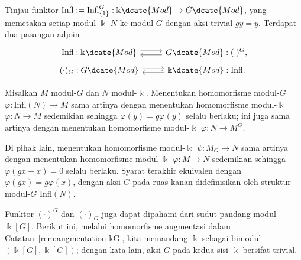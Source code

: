 \begin{proposisi}\label{prop:inv-coinv-infl}
	Tinjau funktor
	$\mathrm{Infl}:=\mathrm{Infl}^G_{\{1\}}:\Bbbk\dcate{Mod}\to
	G\dcate{Mod}$, yang memetakan setiap modul-$\Bbbk$ $N$ ke modul-$G$
	dengan aksi trivial $gy=y$. Terdapat dua pasangan adjoin
	\[\begin{tikzcd}[row sep=tiny]
		\mathrm{Infl}: \Bbbk\dcate{Mod} \arrow[shift left, r] & G\dcate{Mod} : (\cdot)^G , \arrow[shift left, l] \\
		(\cdot)_G: G\dcate{Mod} \arrow[shift left, r] & \Bbbk\dcate{Mod}: \mathrm{Infl}. \arrow[shift left, l]
	\end{tikzcd}\]
\end{proposisi}
\begin{bukti}
	Misalkan $M$ modul-$G$ dan $N$ modul-$\Bbbk$. Menentukan homomorfisme
	modul-$G$ $\varphi:\mathrm{Infl}(N)\to M$ sama artinya dengan menentukan
	homomorfisme modul-$\Bbbk$ $\varphi:N\to M$ sedemikian sehingga
	$\varphi(y)=g\varphi(y)$ selalu berlaku; ini juga sama artinya dengan
	menentukan homomorfisme modul-$\Bbbk$ $\varphi:N\to M^G$.
	
	Di pihak lain, menentukan homomorfisme modul-$\Bbbk$ $\psi:M_G\to N$
	sama artinya dengan menentukan homomorfisme modul-$\Bbbk$
	$\varphi:M\to N$ sedemikian sehingga $\varphi(gx-x)=0$ selalu berlaku.
	Syarat terakhir ekuivalen dengan $\varphi(gx)=g\varphi(x)$, dengan
	aksi $G$ pada ruas kanan didefinisikan oleh struktur modul-$G$
	$\mathrm{Infl}(N)$.
\end{bukti}

Funktor $(\cdot)^G$ dan $(\cdot)_G$ juga dapat dipahami dari sudut pandang
modul-$\Bbbk[G]$. Berikut ini, melalui homomorfisme augmentasi dalam
Catatan~\ref{rem:augmentation-kG}, kita memandang $\Bbbk$ sebagai
bimodul-$(\Bbbk[G],\Bbbk[G])$; dengan kata lain, aksi $G$ pada kedua sisi
$\Bbbk$ bersifat trivial.

